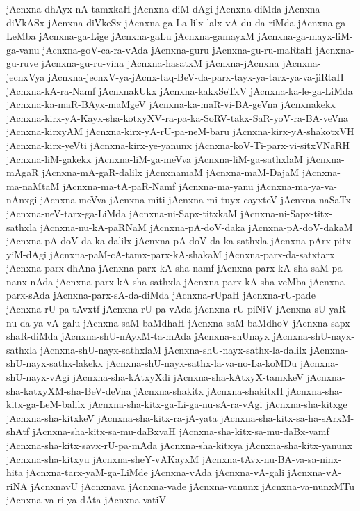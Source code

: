 {jAcnxna-dhAyx-nA-tamxkaH
jAcnxna-diM-dAgi
jAcnxna-diMda
jAcnxna-diVkASx
jAcnxna-diVkeSx
jAcnxna-ga-La-lilx-lalx-vA-du-da-riMda
jAcnxna-ga-LeMba
jAcnxna-ga-Lige
jAcnxna-gaLu
jAcnxna-gamayxM
jAcnxna-ga-mayx-liM-ga-vanu
jAcnxna-goV-ca-ra-vAda
jAcnxna-guru
jAcnxna-gu-ru-maRtaH
jAcnxna-gu-ruve
jAcnxna-gu-ru-vina
jAcnxna-hasatxM
jAcnxna-jAcnxna
jAcnxna-jecnxVya
jAcnxna-jecnxV-ya-jAcnx-taq-BeV-da-parx-tayx-ya-tarx-ya-va-jiRtaH
jAcnxna-kA-ra-Namf
jAcnxnakUkx
jAcnxna-kakxSeTxV
jAcnxna-ka-le-ga-LiMda
jAcnxna-ka-maR-BAyx-maMgeV
jAcnxna-ka-maR-vi-BA-geVna
jAcnxnakekx
jAcnxna-kirx-yA-Kayx-sha-kotxyXV-ra-pa-ka-SoRV-takx-SaR-yoV-ra-BA-veVna
jAcnxna-kirxyAM
jAcnxna-kirx-yA-rU-pa-neM-baru
jAcnxna-kirx-yA-shakotxVH
jAcnxna-kirx-yeVti
jAcnxna-kirx-ye-yanunx
jAcnxna-koV-Ti-parx-vi-sitxVNaRH
jAcnxna-liM-gakekx
jAcnxna-liM-ga-meVva
jAcnxna-liM-ga-sathxlaM
jAcnxna-mAgaR
jAcnxna-mA-gaR-dalilx
jAcnxnamaM
jAcnxna-maM-DajaM
jAcnxna-ma-naMtaM
jAcnxna-ma-tA-paR-Namf
jAcnxna-ma-yanu
jAcnxna-ma-ya-va-nAnxgi
jAcnxna-meVva
jAcnxna-miti
jAcnxna-mi-tuyx-cayxteV
jAcnxna-naSaTx
jAcnxna-neV-tarx-ga-LiMda
jAcnxna-ni-Sapx-titxkaM
jAcnxna-ni-Sapx-titx-sathxla
jAcnxna-nu-kA-paRNaM
jAcnxna-pA-doV-daka
jAcnxna-pA-doV-dakaM
jAcnxna-pA-doV-da-ka-dalilx
jAcnxna-pA-doV-da-ka-sathxla
jAcnxna-pArx-pitx-yiM-dAgi
jAcnxna-paM-cA-tamx-parx-kA-shakaM
jAcnxna-parx-da-satxtarx
jAcnxna-parx-dhAna
jAcnxna-parx-kA-sha-namf
jAcnxna-parx-kA-sha-saM-pa-nanx-nAda
jAcnxna-parx-kA-sha-sathxla
jAcnxna-parx-kA-sha-veMba
jAcnxna-parx-sAda
jAcnxna-parx-sA-da-diMda
jAcnxna-rUpaH
jAcnxna-rU-pade
jAcnxna-rU-pa-tAvxtf
jAcnxna-rU-pa-vAda
jAcnxna-rU-piNiV
jAcnxna-sU-yaR-nu-da-ya-vA-galu
jAcnxna-saM-baMdhaH
jAcnxna-saM-baMdhoV
jAcnxna-sapx-shaR-diMda
jAcnxna-shU-nAyxM-ta-mAda
jAcnxna-shUnayx
jAcnxna-shU-nayx-sathxla
jAcnxna-shU-nayx-sathxlaM
jAcnxna-shU-nayx-sathx-la-dalilx
jAcnxna-shU-nayx-sathx-lakekx
jAcnxna-shU-nayx-sathx-la-va-no-La-koMDu
jAcnxna-shU-nayx-vAgi
jAcnxna-sha-kAtxyXdi
jAcnxna-sha-kAtxyX-tamxkeV
jAcnxna-sha-katxyXM-sha-BeV-deVna
jAcnxna-shakitx
jAcnxna-shakitxH
jAcnxna-sha-kitx-ga-LeM-balilx
jAcnxna-sha-kitx-ga-Li-ga-nu-sA-ra-vAgi
jAcnxna-sha-kitxge
jAcnxna-sha-kitxkeV
jAcnxna-sha-kitx-ra-jA-yata
jAcnxna-sha-kitx-sa-ha-sArxM-shAtf
jAcnxna-sha-kitx-sa-mu-daBxvaH
jAcnxna-sha-kitx-sa-mu-daBx-vamf
jAcnxna-sha-kitx-savx-rU-pa-mAda
jAcnxna-sha-kitxya
jAcnxna-sha-kitx-yanunx
jAcnxna-sha-kitxyu
jAcnxna-sheY-vAKayxM
jAcnxna-tAvx-nu-BA-va-sa-ninx-hita
jAcnxna-tarx-yaM-ga-LiMde
jAcnxna-vAda
jAcnxna-vA-gali
jAcnxna-vA-riNA
jAcnxnavU
jAcnxnava
jAcnxna-vade
jAcnxna-vanunx
jAcnxna-va-nunxMTu
jAcnxna-va-ri-ya-dAta
jAcnxna-vatiV
}
